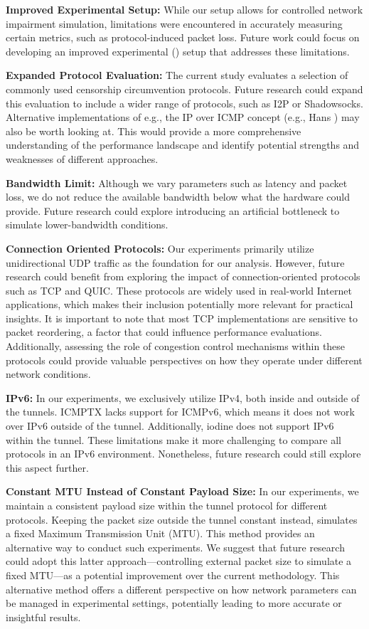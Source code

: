 \noindent\textbf{Improved Experimental Setup:}
While our setup allows for controlled network impairment simulation, limitations were encountered in accurately measuring certain metrics, such as protocol-induced packet loss.
Future work could focus on developing an improved experimental () setup that addresses these limitations.

\noindent\textbf{Expanded Protocol Evaluation:}
The current study evaluates a selection of commonly used censorship circumvention protocols.
Future research could expand this evaluation to include a wider range of protocols, such as I2P or Shadowsocks.
Alternative implementations of e.g., the IP over ICMP concept (e.g., Hans \cite{hans}) may also be worth looking at.
This would provide a more comprehensive understanding of the performance landscape and identify potential strengths and weaknesses of different approaches.

\noindent\textbf{Bandwidth Limit:}
Although we vary parameters such as latency and packet loss, we do not reduce the available bandwidth below what the hardware could provide.
Future research could explore introducing an artificial bottleneck to simulate lower-bandwidth conditions.

\noindent\textbf{Connection Oriented Protocols:}
Our experiments primarily utilize unidirectional UDP traffic as the foundation for our analysis.
However, future research could benefit from exploring the impact of connection-oriented protocols such as TCP and QUIC.
These protocols are widely used in real-world Internet applications, which makes their inclusion potentially more relevant for practical insights.
It is important to note that most TCP implementations are sensitive to packet reordering, a factor that could influence performance evaluations.
Additionally, assessing the role of congestion control mechanisms within these protocols could provide valuable perspectives on how they operate under different network conditions.

\noindent\textbf{IPv6:}
In our experiments, we exclusively utilize IPv4, both inside and outside of the tunnels.
ICMPTX lacks support for ICMPv6, which means it does not work over IPv6 outside of the tunnel.
Additionally, iodine does not support IPv6 within the tunnel.
These limitations make it more challenging to compare all protocols in an IPv6 environment.
Nonetheless, future research could still explore this aspect further.

\noindent\textbf{Constant MTU Instead of Constant Payload Size:}
In our experiments, we maintain a consistent payload size within the tunnel protocol for different protocols.
Keeping the packet size outside the tunnel constant instead, simulates a fixed Maximum Transmission Unit (MTU).
This method provides an alternative way to conduct such experiments.
We suggest that future research could adopt this latter approach—controlling external packet size to simulate a fixed MTU—as a potential improvement over the current methodology.
This alternative method offers a different perspective on how network parameters can be managed in experimental settings, potentially leading to more accurate or insightful results.


